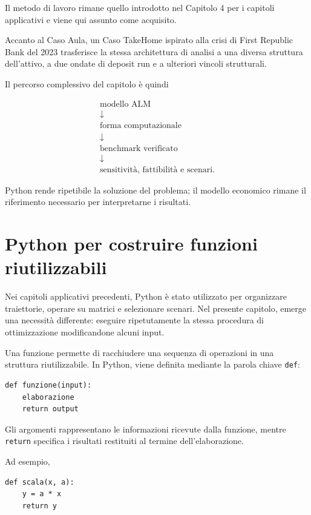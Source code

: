 Il metodo di lavoro rimane quello introdotto nel Capitolo 4 per i capitoli
applicativi e viene qui assunto come acquisito.

Accanto al Caso Aula, un Caso TakeHome ispirato alla crisi di First Republic
Bank del 2023 trasferisce la stessa architettura di analisi a una diversa
struttura dell'attivo, a due ondate di deposit run e a ulteriori vincoli
strutturali.

Il percorso complessivo del capitolo \`e quindi

$$
\begin{array}{c}
\text{modello ALM}
\\[3pt]
\downarrow
\\[3pt]
\text{forma computazionale}
\\[3pt]
\downarrow
\\[3pt]
\text{benchmark verificato}
\\[3pt]
\downarrow
\\[3pt]
\text{sensitivit\`a, fattibilit\`a e scenari}.
\end{array}
$$

Python rende ripetibile la soluzione del problema; il modello economico
rimane il riferimento necessario per interpretarne i risultati.

\section{Python per costruire funzioni riutilizzabili}

Nei capitoli applicativi precedenti, Python \`e stato utilizzato per
organizzare traiettorie, operare su matrici e selezionare scenari. Nel
presente capitolo, emerge una necessit\`a differente: eseguire ripetutamente la
stessa procedura di ottimizzazione modificandone alcuni input.

Una funzione permette di racchiudere una sequenza di operazioni in una
struttura riutilizzabile. In Python, viene definita mediante la parola chiave
\texttt{def}:

\begin{verbatim}
def funzione(input):
    elaborazione
    return output
\end{verbatim}

Gli argomenti rappresentano le informazioni ricevute dalla funzione, mentre
\texttt{return} specifica i risultati restituiti al termine
dell'elaborazione.

Ad esempio,

\begin{verbatim}
def scala(x, a):
    y = a * x
    return y
\end{verbatim}

